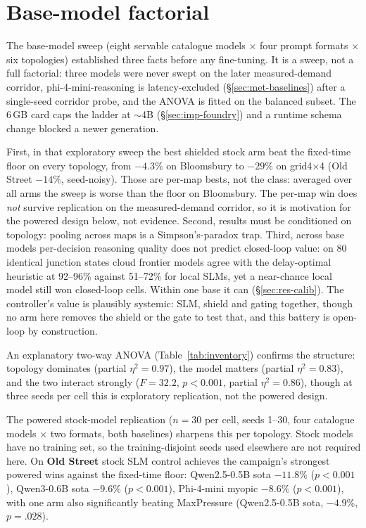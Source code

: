 \section{Base-model factorial}\label{sec:res-factorial}
The base-model sweep (eight servable catalogue models $\times$
four prompt formats $\times$ six topologies) established three facts
before any fine-tuning. It is a sweep, not a full factorial: three models
were never swept on the later measured-demand corridor,
phi-4-mini-reasoning is latency-excluded (\S\ref{sec:met-baselines}) after
a single-seed corridor probe, and the ANOVA is fitted on the balanced subset.
The 6\,GB card caps the ladder at $\sim$4B (\S\ref{sec:imp-foundry}) and
a runtime schema change blocked a newer generation.

First, in that exploratory sweep the best shielded stock arm beat the
fixed-time floor on every topology, from $-4.3\%$ on Bloomsbury to
$-29\%$ on grid4$\times$4 (Old Street $-14\%$, seed-noisy). Those are per-map bests, not the class: averaged
over all arms the sweep is worse than the floor on Bloomsbury. The per-map
win does \emph{not} survive
replication on the measured-demand corridor, so it is motivation for the
powered design below, not evidence. Second, results must be conditioned on
topology: pooling across maps is a Simpson's-paradox trap. Third, across
base models per-decision reasoning quality does not predict closed-loop
value: on 80
identical junction states cloud frontier models agree with the
delay-optimal heuristic at 92--96\% against 51--72\% for local SLMs, yet a
near-chance local model still won closed-loop cells. Within one base it
can (\S\ref{sec:res-calib}). The controller's
value is plausibly systemic: SLM, shield and gating together, though no
arm here removes the shield or the gate to test that, and this battery
is open-loop by construction.

An explanatory two-way ANOVA (Table~\ref{tab:inventory}) confirms the
structure: topology
dominates (partial $\eta^2{=}0.97$), the model matters
(partial $\eta^2{=}0.83$), and the two interact strongly ($F{=}32.2$,
$p{<}0.001$, partial $\eta^2{=}0.86$), though at three seeds per cell this
is exploratory replication, not the powered design.

The powered stock-model replication ($n{=}30$ per cell, seeds 1--30, four
catalogue models $\times$ two formats, both baselines) sharpens this per
topology. Stock models have no training set, so the training-disjoint
seeds used elsewhere are not required here.
On \textbf{Old Street} stock SLM control achieves the campaign's strongest
powered wins against the fixed-time floor: Qwen2.5-0.5B sota $-11.8\%$
($p{<}0.001$), Qwen3-0.6B sota $-9.6\%$ ($p{<}0.001$), Phi-4-mini myopic
$-8.6\%$ ($p{<}0.001$), with one arm also significantly beating MaxPressure
(Qwen2.5-0.5B sota, $-4.9\%$, $p{=}.028$).

